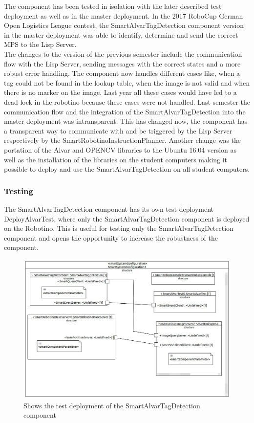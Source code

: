 The component has been tested in isolation with the later described test deployment as well as in the master deployment. In the 2017 RoboCup German Open Logistics League contest, the SmartAlvarTagDetection component version in the master deployment was able to identify, determine and send the correct MPS to the Lisp Server. \\
The changes to the version of the previous semester include the communication flow with the Lisp Server, sending messages with the correct states and a more robust error handling. The component now handles different cases like, when a tag could not be found in the lookup table, when the image is not valid and when there is no marker on the image. Last year all these cases would have led to a dead lock in the robotino because these cases were not handled. Last semester the communication flow and the integration of the SmartAlvarTagDetection into the master deployment was intransparent. This has changed now, the component has a transparent way to communicate with and be triggered by the Lisp Server respectively by the SmartRobotinoInstructionPlanner. Another change was the portation of the Alvar and OPENCV libraries to the Ubuntu 16.04 version as well as the installation of the libraries on the student computers making it possible to deploy and use the SmartAlvarTagDetection on all student computers.

\subsubsection{Testing}

The SmartAlvarTagDetection component has its own test deployment DeployAlvarTest, where only the SmartAlvarTagDetection component is deployed on the Robotino. This is useful for testing only the SmartAlvarTagDetection component and opens the opportunity to increase the robustness of the component. \\

\begin{figure}[h]
\centering
\includegraphics[scale=0.3]{pic/DeployAlvarTest.jpg}
\caption{Shows the test deployment of the SmartAlvarTagDetection component}
\label{fig:smartAlvarDeploy}
\end{figure}

